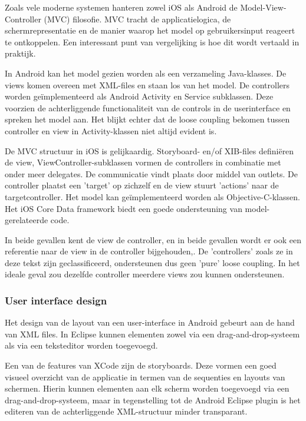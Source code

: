 Zoals vele moderne systemen hanteren zowel iOS als Android de Model-View-Controller (MVC) filosofie. MVC tracht de applicatielogica, de schermrepresentatie en de manier waarop het model op gebruikersinput reageert te ontkoppelen\cite{gamma1995}. Een interessant punt van vergelijking is hoe dit wordt vertaald in praktijk.

In Android kan het model gezien worden als een verzameling Java-klasses. De views komen overeen met XML-files en staan los van het model. De controllers worden ge\"implementeerd als Android Activity en Service subklassen. Deze voorzien de achterliggende functionaliteit van de controls in de userinterface en spreken het model aan. Het blijkt echter dat de loose coupling bekomen tussen controller en view in Activity-klassen niet altijd evident is\cite{therealjoshua2011}.

De MVC structuur in iOS is gelijkaardig. Storyboard- en/of XIB-files defini\"eren de view, ViewController-subklassen vormen de controllers in combinatie met onder meer delegates\cite{goadrich2011}. De communicatie vindt plaats door middel van outlets. De controller plaatst een 'target' op zichzelf en de view stuurt 'actions' naar de targetcontroller\cite{stanford2011}. Het model kan ge\"implementeerd worden als Objective-C-klassen. Het iOS Core Data framework biedt een goede ondersteuning van model-gerelateerde code\cite{apple2013coredata}.

In beide gevallen kent de view de controller, en in beide gevallen wordt er ook een referentie naar de view in de controller bijgehouden\cite{apple2013uiviewcontroller},\cite{android2013activity}. De 'controllers' zoals ze in deze tekst zijn geclassificeerd, ondersteunen dus geen 'pure' loose coupling. In het ideale geval zou dezelfde controller meerdere views zou kunnen ondersteunen.


\subsubsection{User interface design}

Het design van de layout van een user-interface in Android gebeurt aan de hand van XML files\cite{android2013ui}. In Eclipse kunnen elementen zowel via een drag-and-drop-systeem als via een teksteditor worden toegevoegd\cite{goadrich2011}.

Een van de features van XCode zijn de storyboards. Deze vormen een goed visueel overzicht van de applicatie in termen van de sequenties en layouts van schermen. Hierin kunnen elementen aan elk scherm worden toegevoegd via een drag-and-drop-systeem, maar in tegenstelling tot de Android Eclipse plugin is het editeren van de achterliggende XML-structuur minder transparant.


